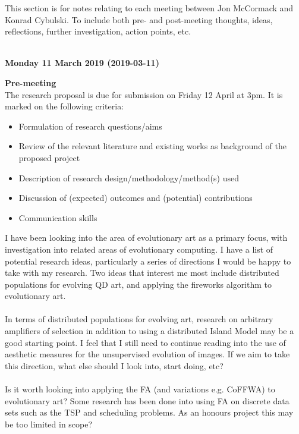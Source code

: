 \documentclass[10pt,a4paper]{article}
\begin{document}
	This section is for notes relating to each meeting between Jon McCormack and Konrad Cybulski. To include both pre- and post-meeting thoughts, ideas, reflections, further investigation, action points, etc.
	\\\\
	
	\begin{center} \textbf{Monday 11 March 2019 (2019-03-11)} \end{center} 
	\textbf{Pre-meeting}
	\\
	The research proposal is due for submission on Friday 12 April at 3pm.
	It is marked on the following criteria:
	\begin{itemize}
		\item Formulation of research questions/aims
		\item Review of the relevant literature and existing works as background of the proposed project
		\item Description of research design/methodology/method(s) used
		\item Discussion of (expected) outcomes and (potential) contributions
		\item Communication skills
	\end{itemize}
	I have been looking into the area of evolutionary art as a primary focus, with investigation into related areas of evolutionary computing.
	I have a list of potential research ideas, particularly a series of directions I would be happy to take with my research.
	Two ideas that interest me most include distributed populations for evolving QD art, and applying the fireworks algorithm to evolutionary art.
	\\\\
	In terms of distributed populations for evolving art, research on arbitrary amplifiers of selection \citep{graph-amplifiers} in addition to using a distributed Island Model \citep{distributed-evolutionary-art} may be a good starting point.
	I feel that I still need to continue reading into the use of aesthetic measures for the unsupervised evolution of images.
	If we aim to take this direction, what else should I look into, start doing, etc?
	\\\\
	Is it worth looking into applying the FA (and variations e.g. CoFFWA) to evolutionary art?
	Some research has been done into using FA on discrete data sets such as the TSP and scheduling problems.
	As an honours project this may be too limited in scope?
	\\\\
\end{document}
